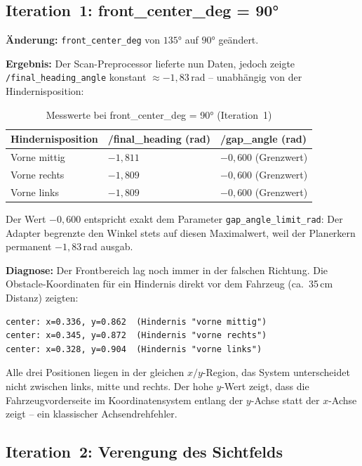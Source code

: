 \subsection{Iteration~1: front\_center\_deg = 90°}

\textbf{Änderung:} \texttt{front\_center\_deg} von $135°$ auf $90°$ geändert.

\textbf{Ergebnis:} Der Scan-Preprocessor lieferte nun Daten,
jedoch zeigte \texttt{/final\_heading\_angle} konstant $\approx -1{,}83$\,rad
-- unabhängig von der Hindernisposition:

\begin{table}[H]
\centering
\caption{Messwerte bei front\_center\_deg = 90° (Iteration~1)}
\label{tab:iter1}
\begin{tabular}{lll}
\toprule
\textbf{Hindernisposition} & \textbf{/final\_heading (rad)} & \textbf{/gap\_angle (rad)} \\
\midrule
Vorne mittig & $-1{,}811$ & $-0{,}600$ (Grenzwert) \\
Vorne rechts & $-1{,}809$ & $-0{,}600$ (Grenzwert) \\
Vorne links  & $-1{,}809$ & $-0{,}600$ (Grenzwert) \\
\bottomrule
\end{tabular}
\end{table}

Der Wert $-0{,}600$ entspricht exakt dem Parameter
\texttt{gap\_angle\_limit\_rad}: Der Adapter begrenzte den Winkel stets
auf diesen Maximalwert, weil der Planerkern permanent $-1{,}83$\,rad ausgab.

\textbf{Diagnose:} Der Frontbereich lag noch immer in der falschen Richtung.
Die Obstacle-Koordinaten für ein Hindernis direkt vor dem Fahrzeug
(ca.\ 35\,cm Distanz) zeigten:

\begin{lstlisting}[caption={Obstacle-Koordinaten bei Hindernis vorne (Iteration~1)}]
center: x=0.336, y=0.862  (Hindernis "vorne mittig")
center: x=0.345, y=0.872  (Hindernis "vorne rechts")
center: x=0.328, y=0.904  (Hindernis "vorne links")
\end{lstlisting}

Alle drei Positionen liegen in der gleichen $x/y$-Region,
das System unterscheidet nicht zwischen links, mitte und rechts.
Der hohe $y$-Wert zeigt, dass die Fahrzeugvorderseite im
Koordinatensystem entlang der $y$-Achse statt der $x$-Achse zeigt --
ein klassischer Achsendrehfehler.

\subsection{Iteration~2: Verengung des Sichtfelds}

